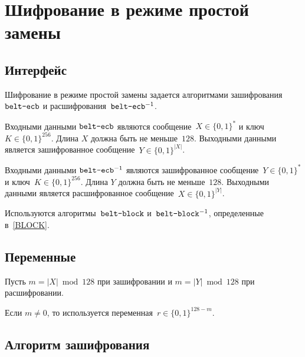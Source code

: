 \section{Шифрование в режиме простой замены}\label{ECB}

\subsection{Интерфейс}\label{ECB.IFace}

Шифрование в режиме простой замены задается алгоритмами 
зашифрования~$\texttt{belt-ecb}$ и расшифрования~$\texttt{belt-ecb}^{-1}$.

Входными данными $\texttt{belt-ecb}$ являются сообщение~$X\in\{0,1\}^*$ и 
ключ~$K\in\{0,1\}^{256}$. 
%
Длина $X$ должна быть не меньше~$128$.
%
Выходными данными является зашифрованное сообщение~$Y\in\{0,1\}^{|X|}$.

Входными данными $\texttt{belt-ecb}^{-1}$ являются зашифрованное 
сообщение~$Y\in\{0,1\}^*$ и ключ~$K\in\{0,1\}^{256}$. 
%
Длина $Y$ должна быть не меньше~$128$.
%
Выходными данными является расшифрованное сообщение~$X\in\{0,1\}^{|Y|}$.

Используются алгоритмы~$\texttt{belt-block}$ и~$\texttt{belt-block}^{-1}$, 
определенные в~\ref{BLOCK}.

\subsection{Переменные}\label{ECB.Vars}

Пусть $m=|X|\bmod 128$ при зашифровании 
и $m=|Y|\bmod 128$ при расшифровании.

Если $m\neq 0$, то используется переменная~$r\in\{0,1\}^{128-m}$.

\subsection{Алгоритм зашифрования}\label{ECB.Encr}

